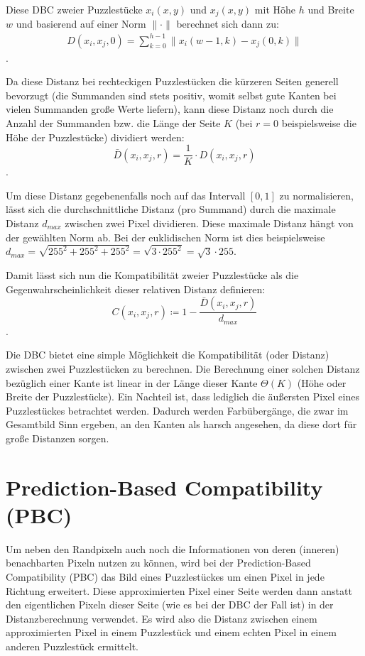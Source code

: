\documentclass{whswinvcbook}
\begin{document}
Diese DBC zweier Puzzlestücke $x_i(x,y)$ und $x_j(x,y)$ mit Höhe $h$ und Breite $w$ und basierend auf einer Norm $\|\cdot\|$ berechnet sich dann zu:
\begin{align} \label{eq-dbc}
    D(x_i,x_j,0)=\sum_{k=0}^{h-1}\|x_i(w-1,k)-x_j(0,k)\|
\end{align}
.

Da diese Distanz bei rechteckigen Puzzlestücken die kürzeren Seiten generell bevorzugt (die Summanden sind stets positiv, womit selbst gute Kanten bei vielen Summanden große Werte liefern), kann diese Distanz noch durch die Anzahl der Summanden bzw. die Länge der Seite $K$ (bei $r=0$ beispielsweise die Höhe der Puzzlestücke) dividiert werden: $$\bar{D}(x_i,x_j,r)=\frac{1}{K}\cdot D(x_i,x_j,r)$$.

Um diese Distanz gegebenenfalls noch auf das Intervall $[0,1]$ zu normalisieren, lässt sich die durchschnittliche Distanz (pro Summand) durch die maximale Distanz $d_{max}$ zwischen zwei Pixel dividieren. Diese maximale Distanz hängt von der gewählten Norm ab. Bei der euklidischen Norm ist dies beispielsweise $d_{max}=\sqrt{255^2+255^2+255^2}=\sqrt{3\cdot255^2}=\sqrt{3}\cdot255$.

Damit lässt sich nun die Kompatibilität zweier Puzzlestücke als die Gegenwahrscheinlichkeit dieser relativen Distanz definieren:$$C(x_i,x_j,r)\coloneqq 1-\frac{\bar{D}(x_i,x_j,r)}{d_{max}}$$.

Die DBC bietet eine simple Möglichkeit die Kompatibilität (oder Distanz) zwischen zwei Puzzlestücken zu berechnen. Die Berechnung einer solchen Distanz bezüglich einer Kante ist linear in der Länge dieser Kante $\Theta(K)$ (Höhe oder Breite der Puzzlestücke). Ein Nachteil ist, dass lediglich die äußersten Pixel eines Puzzlestückes betrachtet werden. Dadurch werden Farbübergänge, die zwar im Gesamtbild Sinn ergeben, an den Kanten als harsch angesehen, da diese dort für große Distanzen sorgen.
\section{Prediction-Based Compatibility (PBC)}\label{section-pbc}
Um neben den Randpixeln auch noch die Informationen von deren (inneren) benachbarten Pixeln nutzen zu können, wird bei der Prediction-Based Compatibility (PBC) das Bild eines Puzzlestückes um einen Pixel in jede Richtung erweitert. Diese approximierten Pixel einer Seite werden dann anstatt den eigentlichen Pixeln dieser Seite (wie es bei der DBC der Fall ist) in der Distanzberechnung verwendet. Es wird also die Distanz zwischen einem approximierten Pixel in einem Puzzlestück und einem echten Pixel in einem anderen Puzzlestück ermittelt.
\end{document}
